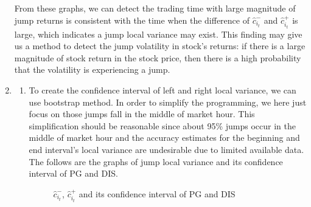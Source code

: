 \documentclass[12pt,letterpaper]{article}
\begin{document}
\begin{enumerate}[label=\textbf{(\Alph*)}]
From these graphs, we can detect the trading time with large magnitude of jump returns is consistent with the time when the difference of $\hat{c}_{i_t}^-$ and $\hat{c}_{i_t}^+$ is large, which indicates a jump local variance may exist. This finding may give us a method to detect the jump volatility in stock's returns: if there is a large magnitude of stock return in the stock price, then there is a high probability that the volatility is experiencing a jump. 


\item 
\begin{enumerate}[label=(\roman*)]
	\item To create the confidence interval of left and right local variance, we can use bootstrap method. In order to simplify the programming, we here just focus on those jumps fall in the middle of market hour. This simplification should be reasonable since about 95\% jumps occur in the middle of market hour and the accuracy estimates for the beginning and end interval's local variance are undesirable due to limited available data. \\

    The follows are the graphs of jump local variance and its confidence interval of PG and DIS.

 \begin{figure}[H]
	\centering
	\caption{ $\hat{c}_{i_t}^-$, $\hat{c}_{i_t}^+$ and its confidence interval of PG and DIS}
\end{figure}


\end{enumerate}
\end{enumerate}
\end{document}
